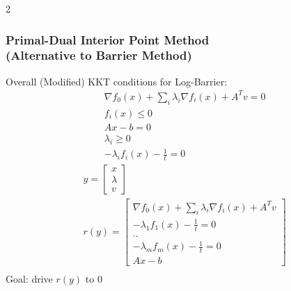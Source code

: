 \documentclass[8pt]{extarticle}
\begin{document}
\begin{multicols*}{2}
  \subsubsection{Primal-Dual Interior Point Method\\ (Alternative to Barrier Method)}
  Overall (Modified) KKT conditions for Log-Barrier:
  \begin{align*}
    &\nabla f_0(x) + \sum_i \lambda_i \nabla f_i(x) + A^T v = 0\\
    &f_i(x) \leq  0\\
    &Ax - b = 0\\
    &\lambda_i \geq 0\\
    &-\lambda_i f_i(x) -\frac{1}{t} = 0
  \end{align*}
  \begin{align*}
    &y =
    \begin{bmatrix}
      x\\ \lambda\\ v
    \end{bmatrix}\\
    &r(y) =
    \begin{bmatrix}
      \nabla f_0(x) + \sum_i \lambda_i \nabla f_i(x) + A^T v\\
      -\lambda_1 f_1(x)-\frac{1}{t} = 0\\
      ..\\
      -\lambda_m f_m(x)-\frac{1}{t} = 0\\
      Ax-b
    \end{bmatrix}\\
  \end{align*}
  Goal: drive $r(y)$ to 0\\


\end{multicols*}
\end{document}
